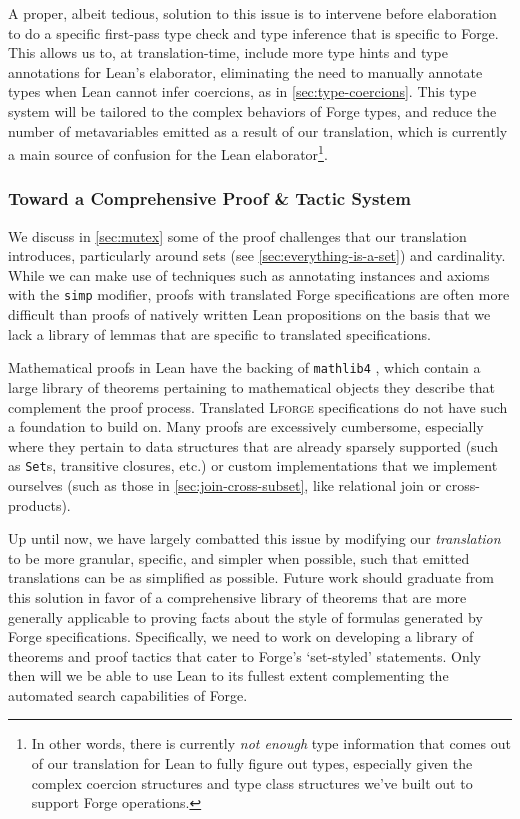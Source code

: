 A proper, albeit tedious, solution to this issue is to intervene before elaboration to do a specific first-pass type check and type inference that is specific to Forge. This allows us to, at translation-time, include more type hints and type annotations for Lean's elaborator, eliminating the need to manually annotate types when Lean cannot infer coercions, as in \cref{sec:type-coercions}. This type system will be tailored to the complex behaviors of Forge types, and reduce the number of metavariables emitted as a result of our translation, which is currently a main source of confusion for the Lean elaborator\footnote{In other words, there is currently \emph{not enough} type information that comes out of our translation for Lean to fully figure out types, especially given the complex coercion structures and type class structures we've built out to support Forge operations.}. 

\subsubsection{Toward a Comprehensive Proof \& Tactic System}

We discuss in \cref{sec:mutex} some of the proof challenges that our translation introduces, particularly around sets (see \cref{sec:everything-is-a-set}) and cardinality. While we can make use of techniques such as annotating instances and axioms with the \texttt{simp} modifier, proofs with translated Forge specifications are often more difficult than proofs of natively written Lean propositions on the basis that we lack a library of lemmas that are specific to translated specifications. 

Mathematical proofs in Lean have the backing of \texttt{mathlib4} \cite{moura2021lean}, which contain a large library of theorems pertaining to mathematical objects they describe that complement the proof process. Translated \textsc{Lforge} specifications do not have such a foundation to build on. Many proofs are excessively cumbersome, especially where they pertain to data structures that are already sparsely supported (such as \texttt{Set}s, transitive closures, etc.) or custom implementations that we implement ourselves (such as those in \cref{sec:join-cross-subset}, like relational join or cross-products). 

Up until now, we have largely combatted this issue by modifying our \emph{translation} to be more granular, specific, and simpler when possible, such that emitted translations can be as simplified as possible. Future work should graduate from this solution in favor of a comprehensive library of theorems that are more generally applicable to proving facts about the style of formulas generated by Forge specifications. Specifically, we need to work on developing a library of theorems and proof tactics that cater to Forge's `set-styled' statements. Only then will we be able to use Lean to its fullest extent complementing the automated search capabilities of Forge. 

